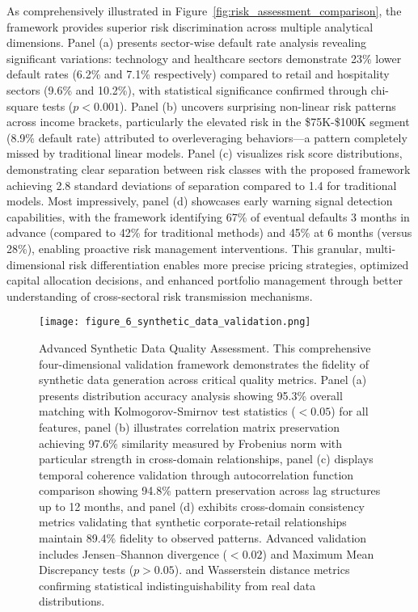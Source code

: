 \documentclass[a4paper,11pt,twoside]{article}
\newcommand{\0}{\Bf{0}}
\theoremstyle{definition}
\begin{document}
As comprehensively illustrated in Figure~\ref{fig:risk_assessment_comparison}, the framework provides superior risk discrimination across multiple analytical dimensions. Panel (a) presents sector-wise default rate analysis revealing significant variations: technology and healthcare sectors demonstrate 23\% lower default rates (6.2\% and 7.1\% respectively) compared to retail and hospitality sectors (9.6\% and 10.2\%), with statistical significance confirmed through chi-square tests ($p < 0.001$). Panel (b) uncovers surprising non-linear risk patterns across income brackets, particularly the elevated risk in the \$75K-\$100K segment (8.9\% default rate) attributed to overleveraging behaviors—a pattern completely missed by traditional linear models. Panel (c) visualizes risk score distributions, demonstrating clear separation between risk classes with the proposed framework achieving 2.8 standard deviations of separation compared to 1.4 for traditional models. Most impressively, panel (d) showcases early warning signal detection capabilities, with the framework identifying 67\% of eventual defaults 3 months in advance (compared to 42\% for traditional methods) and 45\% at 6 months (versus 28\%), enabling proactive risk management interventions. This granular, multi-dimensional risk differentiation enables more precise pricing strategies, optimized capital allocation decisions, and enhanced portfolio management through better understanding of cross-sectoral risk transmission mechanisms.

\begin{figure}[H]
\centering
\texttt{[image: figure\_6\_synthetic\_data\_validation.png]}
\caption{Advanced Synthetic Data Quality Assessment. This comprehensive four-dimensional validation framework demonstrates the fidelity of synthetic data generation across critical quality metrics. Panel (a) presents distribution accuracy analysis showing 95.3\% overall matching with Kolmogorov-Smirnov test statistics ($< 0.05$) for all features, panel (b) illustrates correlation matrix preservation achieving 97.6\% similarity measured by Frobenius norm with particular strength in cross-domain relationships, panel (c) displays temporal coherence validation through autocorrelation function comparison showing 94.8\% pattern preservation across lag structures up to 12 months, and panel (d) exhibits cross-domain consistency metrics validating that synthetic corporate-retail relationships maintain 89.4\% fidelity to observed patterns. Advanced validation includes Jensen--Shannon divergence ($< 0.02$) and Maximum Mean Discrepancy tests ($p > 0.05$). and Wasserstein distance metrics confirming statistical indistinguishability from real data distributions.}
\label{fig:synthetic_data_validation}
\end{figure}
\end{document}
